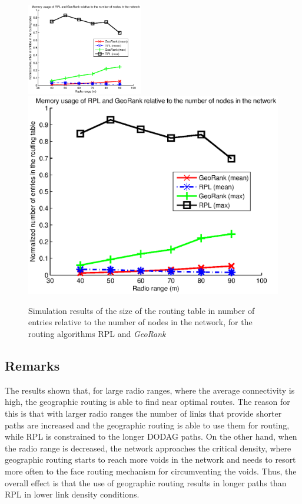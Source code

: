 \documentclass[final,authoryear,3p,twocolumn]{elsarticle}
\begin{document}
\begin{figure}
\centering
\ifdefined\TWOCOL
\includegraphics[width=0.45\textwidth]{figures/mem_usage_range.eps}
\else
\includegraphics[width=1\textwidth]{figures/mem_usage_range.eps}
\fi
\caption{Simulation results of the size of the routing table in number of entries relative to the number of nodes in the network, for the routing algorithms RPL and \textit{GeoRank}}
\label{sim_results2}
\end{figure}

\subsection{Remarks}

The results shown that, for large radio ranges, where the average connectivity is high, the geographic routing is able to find near optimal routes. The reason for this is that with larger radio ranges the number of links that provide shorter paths are increased and the geographic routing is able to use them for routing, while RPL is constrained to the longer DODAG paths. On the other hand, when the radio range is decreased, the network approaches the critical density, where geographic routing starts to reach more voids in the network and needs to resort more often to the face routing mechanism for circumventing the voids. Thus, the overall effect is that the use of geographic routing results in longer paths than RPL in lower link density conditions.
\end{document}

